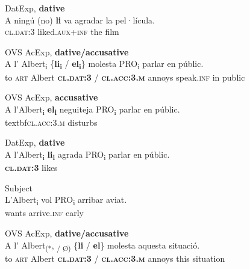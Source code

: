\documentclass[output=paper,colorlinks,citecolor=brown,nonflat,modfonts]{langsci/langscibook}
\begin{document}
 \ex  DatExp, \textbf{dative} \label{ex:royo:11c}\\
 \gll  A ningú (no) \textbf{li} va agradar la pel·lícula. \\
  \textsc{cl.dat:3} liked.\textsc{aux+inf} the film\\
\glt {}

 
 
  \z
  \z


\ea%
 \label{ex:royo:12}
 \ea OVS AcExp, \textbf{dative/accusative} \label{ex:royo:12a}\\
 \gll  A l’ Albert\textsubscript{i} \{\textbf{li\textsubscript{i}} / \textbf{el\textsubscript{i}}\} molesta PRO\textsubscript{i} parlar en públic.\\
 to \textsc{art} Albert \textbf{\textsc{cl.dat:3}} / \textbf{\textsc{cl.acc:3.m}} annoys speak.\textsc{inf} in public\\
\glt {}
 
 \ex OVS AcExp, \textbf{accusative}\label{ex:royo:12b}\\
 \gll A l’Albert\textsubscript{i} \textbf{el\textsubscript{i}} neguiteja PRO\textsubscript{i} parlar en públic.\\
  textbf{\textsc{cl.acc:3.m}} disturbs\\
\glt {}
 
 \ex DatExp, \textbf{dative}\label{ex:royo:12c}\\
 \gll A l’Albert\textsubscript{i} \textbf{li\textsubscript{i}} agrada PRO\textsubscript{i} parlar en públic.\\
   \textbf{\textsc{cl.dat:3}} likes\\
\glt {}
 
 \ex Subject\label{ex:royo:12d}\\
 \gll L’Albert\textsubscript{i} vol PRO\textsubscript{i} arribar aviat.\\
  wants arrive.\textsc{inf} early\\
\glt {}
 
 \z
 \z


 
\ea%
 \label{ex:royo:13}
 \ea OVS AcExp, \textbf{dative/accusative}\label{ex:royo:13a}\\
 \gll A l’ Albert\textsubscript{(*}, \textsubscript{/ Ø)} \{\textbf{li} / \textbf{el}\} molesta aquesta situació.\\
 to \textsc{art} Albert \textbf{\textsc{cl.dat:3}} / \textbf{\textsc{cl.acc:3.m}} annoys this situation\\
\glt {}
 
\end{document}
